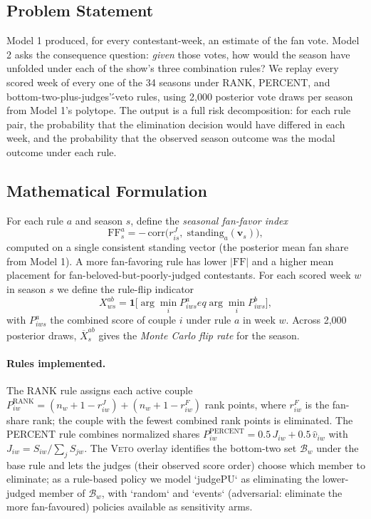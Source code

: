 \documentclass[11pt]{article}
\begin{document}
\subsection{Problem Statement}

Model 1 produced, for every contestant-week, an estimate of the fan vote. Model 2 asks the
consequence question: \emph{given} those votes, how would the season have unfolded under each of
the show's three combination rules? We replay every scored week of every one of the 34 seasons
under RANK, PERCENT, and bottom-two-plus-judges'\'-veto rules, using 2,000 posterior vote draws
per season from Model 1's polytope. The output is a full risk decomposition: for each rule pair,
the probability that the elimination decision would have differed in each week, and the
probability that the observed season outcome was the modal outcome under each rule.

\subsection{Mathematical Formulation}

For each rule $a$ and season $s$, define the \emph{seasonal fan-favor index}
\begin{equation}
\mathrm{FF}^{a}_s = -\,\mathrm{corr}\big( r^{J}_{is},\; \text{standing}_a(\mathbf{v}_s) \big),
\label{eq:ff}
\end{equation}
computed on a single consistent standing vector (the posterior mean fan share from Model 1).
A more fan-favoring rule has lower $|\mathrm{FF}|$ and a higher mean placement for
fan-beloved-but-poorly-judged contestants. For each scored week $w$ in season $s$ we define the
rule-flip indicator
\begin{equation}
X^{ab}_{ws} = \mathbf{1}\big[ \arg\min_i P^{a}_{iws} 
eq \arg\min_i P^{b}_{iws} \big],
\label{eq:flip}
\end{equation}
with $P^{a}_{iws}$ the combined score of couple $i$ under rule $a$ in week $w$. Across 2,000
posterior draws, $\overline{X}^{ab}_{s}$ gives the \emph{Monte Carlo flip rate} for the season.

\paragraph{Rules implemented.} The RANK rule assigns each active couple
$P^{\mathrm{RANK}}_{iw} = (n_w + 1 - r^{J}_{iw}) + (n_w + 1 - r^{F}_{iw})$ rank points, where
$r^{F}_{iw}$ is the fan-share rank; the couple with the fewest combined rank points is eliminated.
The PERCENT rule combines normalized shares $P^{\mathrm{PERCENT}}_{iw} = 0.5\,J_{iw} + 0.5\,\hat{v}_{iw}$
with $J_{iw} = S_{iw}/\sum_j S_{jw}$. The \textsc{Veto} overlay identifies the bottom-two set
$\mathcal{B}_w$ under the base rule and lets the judges (their observed score order) choose which
member to eliminate; as a rule-based policy we model `judgePU` as eliminating the lower-judged
member of $\mathcal{B}_w$, with `random` and `events` (adversarial: eliminate the more
fan-favoured) policies available as sensitivity arms.
\end{document}
